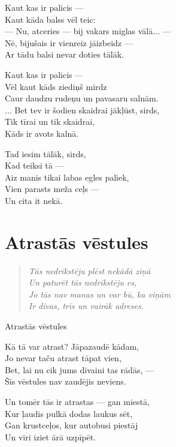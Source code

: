 \documentclass[14pt]{extarticle}
\begin{document}
{{Kaut kas ir palicis --- \\
Kaut kāda balss vēl teic:\\
--- Nu, atceries --- bij vakars miglas vālā... ---\\
Nē, bijušais ir vienreiz jāizbeidz ---\\
Ar tādu balsi nevar doties tālāk. 

Kaut kas ir palicis ---\\
Vēl kaut kāds ziediņš mirdz\\
Caur daudzu rudeņu un pavasaru salnām.\\
... Bet tev ir šodien skaidrai jākļūst, sirds,\\
Tik tīrai un tik skaidrai,\\
Kāds ir avots kalnā. 

Tad iesim tālāk, sirds,\\
Kad teiksi tā ---\\
Aiz manis tikai labas egles paliek,\\
Vien parasts meža ceļs ---\\
Un cita it nekā.





\newpage

\section{Atrastās vēstules}

\begin{quote}
{\em
Tās nedrīkstēju plēst nekādā ziņā\\
Un paturēt tās nedrīkstēju es,\\
Jo tās nav manas un var bū, ka viņām\\
Ir divas, trīs un vairāk adreses.
}
\end{quote}

{\large \sc Atrastās vēstules}

Kā tā var atrast? Jāpazaudē kādam,\\
Jo nevar taču atrast tāpat vien,\\
Bet, lai nu cik jums dīvaini tas rādās, ---\\
Šīs vēstules nav zaudējis neviens. 

Un tomēr tās ir atrastas --- gan miestā,\\
Kur ļaudis pulkā dodas laukus sēt,\\
Gan krustceļos, kur autobusi piestāj\\
Un vīri iziet ārā uzpīpēt. 

}}
\end{document}
